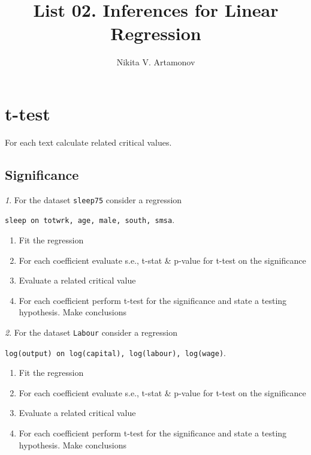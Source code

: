 \documentclass[12pt]{article}
\title{List 02. Inferences for Linear Regression}
\author{Nikita V. Artamonov}
\theoremstyle{remark}
\newtheorem{problem}{}[section]
\begin{document}
\maketitle

\tableofcontents

\section{t-test}

For each text calculate related critical values.

\subsection{Significance}

\begin{problem}
For the dataset \texttt{sleep75} consider a regression
\begin{center}
	\texttt{sleep on totwrk, age, male, south, smsa}.
\end{center}
\begin{enumerate}
	\item Fit the regression
	\item For each coefficient evaluate s.e., t-stat \& p-value for t-test on the significance 
	\item Evaluate a related critical value
	\item For each coefficient perform t-test for the significance and state a testing hypothesis. 
	Make conclusions
\end{enumerate}
\end{problem}

\begin{problem}
For the dataset \texttt{Labour} consider a regression
\begin{center}
	\texttt{log(output) on log(capital), log(labour), log(wage)}.
\end{center}
\begin{enumerate}
	\item Fit the regression
	\item For each coefficient evaluate s.e., t-stat \& p-value for t-test on the significance 
	\item Evaluate a related critical value
	\item For each coefficient perform t-test for the significance and state a testing hypothesis.
	Make conclusions
\end{enumerate}
\end{problem}
\end{document}
